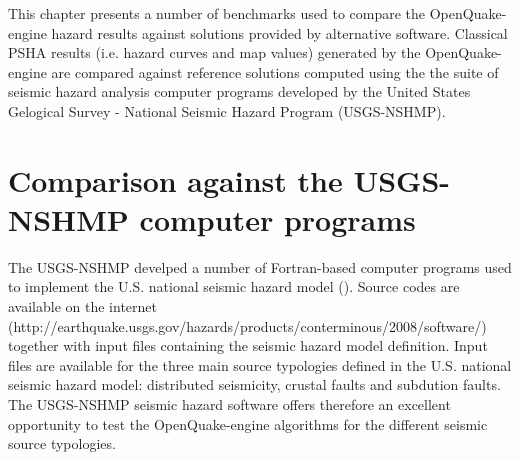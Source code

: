 This chapter presents a number of benchmarks used to compare the OpenQuake-engine
hazard results against solutions provided by alternative software. Classical PSHA results (i.e. hazard curves and map values) generated by the OpenQuake-engine are compared against reference solutions computed using the the suite of seismic hazard analysis computer programs developed by the United States Gelogical Survey - National Seismic Hazard Program (USGS-NSHMP).
%
%
%
\section{Comparison against the USGS-NSHMP computer programs}
The USGS-NSHMP develped a number of Fortran-based computer programs used to implement the U.S. national seismic hazard model (\cite{petersen2008}). Source codes are available on the internet (http://earthquake.usgs.gov/hazards/products/conterminous/2008/software/) together with input files containing the seismic hazard model definition. Input files are available for the three main source typologies
defined in the U.S. national seismic hazard model: distributed seismicity, crustal faults and subdution faults.
The USGS-NSHMP seismic hazard software offers therefore an excellent opportunity to test the OpenQuake-engine algorithms for the different seismic source typologies.

